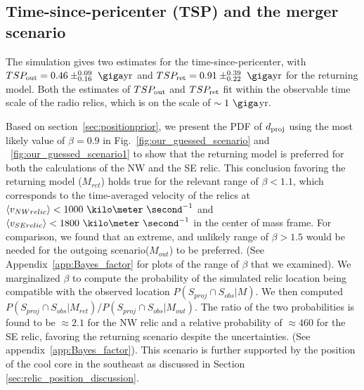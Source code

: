 \subsection{Time-since-pericenter (TSP) and the merger scenario}
\label{sec:merger_scenario}
The simulation gives two estimates for
the time-since-pericenter, with $TSP_{\rm out} = 0.46\pm^{0.09}_{0.16}~\giga \text{yr}$
and $TSP_{\rm ret} =0.91\pm^{0.39}_{0.22}~\giga\text{yr}$ for the returning model. Both the estimates of
$TSP_{\rm out}$ and $TSP_{\rm ret}$ 
fit within the observable time scale of the radio
relics, which is on the scale of $\sim1~\giga$yr.\par 
Based on section~\ref{sec:positionprior}, we present the PDF of
$d_{\rm proj}$ using the most likely
value of $\beta = 0.9$ in Fig.~\ref{fig:our_guessed_scenario} and
~\ref{fig:our_guessed_scenario1} to show that
the returning model is preferred for both the calculations of the NW and the
SE relic. This conclusion favoring the returning model ($M_{ret}$) holds true for the
relevant range of $  \beta
< 1.1$, which corresponds to the time-averaged velocity of the relics at
$\langle v_{NW relic} \rangle < 1000~\kilo\meter~\second^{-1}$ and $\langle
v_{SE relic} \rangle < 1800~\kilo\meter~\second^{-1}$ in the center of
mass frame. For comparison, we found that an extreme, and unlikely
range of $\beta > 1.5$ would be needed for the outgoing scenario($M_{out}$) to be
preferred. (See Appendix~\ref{app:Bayes_factor} for plots of the range
of $\beta$ that we examined). We marginalized $\beta$ to compute the
probability of the simulated relic location being compatible with the
observed location $P(S_{proj} \cap S_{obs}| M)$. We then computed   
$P(S_{proj} \cap S_{obs} | M_{ret}) / P(S_{proj} \cap S_{obs} | M_{out})$. 
The ratio of the two probabilities is found to be $\approx
2.1$ for the NW relic and a relative probability of $\approx 460$ for the
SE relic, favoring the returning scenario despite the
uncertainties. (See appendix~\ref{app:Bayes_factor}). This scenario is
further supported by the position of the cool core in the southeast as
discussed in Section \ref{sec:relic_position_discussion}.  
